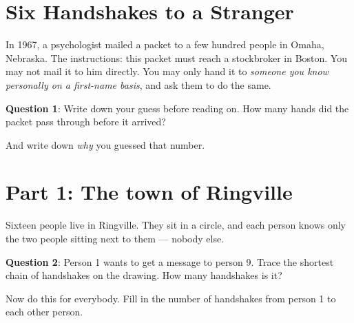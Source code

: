 \documentclass[a4paper, 14pt]{extarticle}
\begin{document}
\section*{Six Handshakes to a Stranger}

In 1967, a psychologist mailed a packet to a few hundred people in Omaha,
Nebraska. The instructions: this packet must reach a stockbroker in Boston.
You may not mail it to him directly. You may only hand it to \emph{someone you
know personally on a first-name basis}, and ask them to do the same.

{\bf Question 1}:
Write down your guess before reading on. How many hands did the packet pass
through before it arrived? \underline{\hspace{2cm}}

And write down \emph{why} you guessed that number.

\underline{\hspace{\textwidth}}

\clearpage

\section*{Part 1: The town of Ringville}

Sixteen people live in Ringville. They sit in a circle, and each person knows
only the two people sitting next to them --- nobody else.

\begin{center}
\end{center}

{\bf Question 2}:
Person 1 wants to get a message to person 9. Trace the shortest chain of
handshakes on the drawing. How many handshakes is it? \underline{\hspace{2cm}}

Now do this for everybody. Fill in the number of handshakes from person 1 to
each other person.
\end{document}
